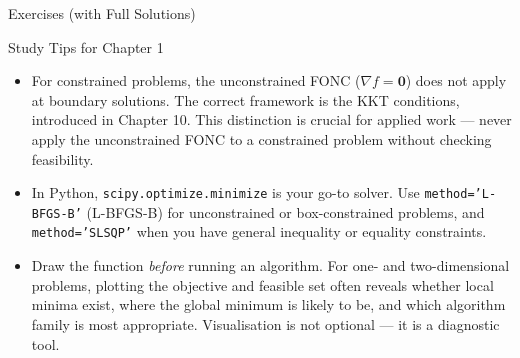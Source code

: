 \documentclass[aspectratio=169,10pt]{beamer}
\newcommand{\grad}{\nabla}
\begin{document}
\begin{frame}[allowframebreaks]{Exercises (with Full Solutions)}
\begin{exampleblock}{Study Tips for Chapter 1}
\begin{itemize}
      \item For constrained problems, the unconstrained FONC ($\grad f = \mathbf{0}$)
        does not apply at boundary solutions.  The correct framework is the
        KKT conditions, introduced in Chapter 10.  This distinction is crucial
        for applied work --- never apply the unconstrained FONC to a constrained
        problem without checking feasibility.

      \item In Python, \texttt{scipy.optimize.minimize} is your go-to solver.
        Use \texttt{method='L-BFGS-B'} (L-BFGS-B) for unconstrained or
        box-constrained problems, and \texttt{method='SLSQP'} when you have
        general inequality or equality constraints.

      \item Draw the function \emph{before} running an algorithm.  For one-
        and two-dimensional problems, plotting the objective and feasible set
        often reveals whether local minima exist, where the global minimum
        is likely to be, and which algorithm family is most appropriate.
        Visualisation is not optional --- it is a diagnostic tool.
    \end{itemize}
  \end{exampleblock}

\end{frame}
\end{document}
